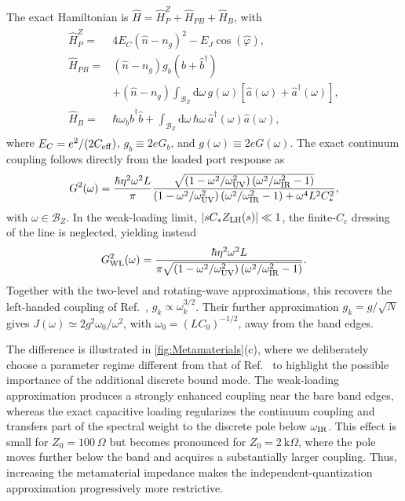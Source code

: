 \documentclass[prx,aps,twocolumn,article]{revtex4-2}
\begin{document}
The exact Hamiltonian is
$\hat H=\hat H_P^Z+\hat H_{PB}+\hat H_B$, with
\begin{align}
\begin{aligned}
\hat H_P^Z
={}&
4E_C(\hat n-n_g)^2-E_J\cos(\hat\varphi),
\\
\hat H_{PB}
={}&
(\hat n-n_g)
g_b(\hat b+\hat b^\dagger)
\\
&+
(\hat n-n_g)
\int_{\mathcal B_Z}
\mathrm d\omega\,
g(\omega)
[\hat a(\omega)+\hat a^\dagger(\omega)],
\\
\hat H_B
={}&
\hbar\omega_b\hat b^\dagger\hat b
+
\int_{\mathcal B_Z}
\mathrm d\omega\,
\hbar\omega\,
\hat a^\dagger(\omega)\hat a(\omega),
\end{aligned}
\label{Eq:LHTLExactHamiltonian}
\end{align}
where $E_C=e^2/(2C_{\rm eff})$, $g_b\equiv2eG_b$, and
$g(\omega)\equiv2eG(\omega)$. The exact continuum coupling follows
directly from the loaded port response as
\begin{align}
G^2(\omega)
=
\frac{\hbar\eta^2\omega^2L}{\pi}
\frac{
\sqrt{
\left(1-\omega^2/\omega_{\rm UV}^2\right)
\left(\omega^2/\omega_{\rm IR}^2-1\right)
}
}{
\left(1-\omega^2/\omega_{\rm UV}^2\right)
\left(\omega^2/\omega_{\rm IR}^2-1\right)
+\omega^4L^2C_*^2
},
\label{Eq:LHTLG}
\end{align}
with $\omega\in\mathcal B_Z$. In the weak-loading limit,
$|sC_*Z_{\rm LH}(s)|\ll1$, the finite-$C_c$ dressing of the line is neglected, yielding instead
\begin{align}
G_{\rm WL}^2(\omega)
=
\frac{\hbar\eta^2\omega^2L}{
\pi
\sqrt{
\left(1-\omega^2/\omega_{\rm UV}^2\right)
\left(\omega^2/\omega_{\rm IR}^2-1\right)
}
}.
\label{Eq:LHTLGWeakLoading}
\end{align}
Together with the two-level and rotating-wave approximations, this recovers the left-handed coupling of Ref.~\cite{Goswami:2026}, $g_k\propto\omega_k^{3/2}$. Their further approximation $g_k=g/\sqrt N$ gives $J(\omega)\simeq2g^2\omega_0/\omega^2$, with $\omega_0=(LC_0)^{-1/2}$, away from the band edges.

The difference is illustrated in \cref{fig:Metamaterials}(c), where we deliberately choose a parameter regime different from that of Ref.~\cite{Goswami:2026} to highlight the possible importance of the additional discrete bound mode. The weak-loading approximation produces a strongly enhanced coupling near the bare band edges, whereas the exact capacitive loading regularizes the continuum coupling and transfers part of the spectral weight to the discrete pole below $\omega_{\rm IR}$. This effect is small for $Z_0=100~\Omega$ but becomes pronounced for $Z_0=2~\mathrm{k}\Omega$, where the pole moves further below the band and acquires a substantially larger coupling. Thus, increasing the metamaterial impedance makes the independent-quantization approximation progressively more restrictive.
\end{document}
